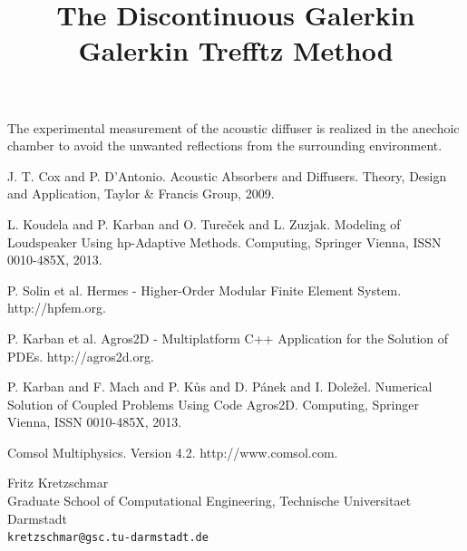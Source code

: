 \documentclass[article,A4,11pt]{llncs}%
\begin{document}
The experimental measurement of the acoustic diffuser is realized in the anechoic chamber to avoid the unwanted reflections from the surrounding environment.


\begin{thebibliography}{10}
{\sc  J. T. Cox and P. D’Antonio}. {Acoustic Absorbers and Diffusers}. Theory, Design and Application, Taylor \& Francis Group, 2009.

{\sc L. Koudela and P. Karban and O. Tureček and L. Zuzjak}. {Modeling of Loudspeaker Using hp-Adaptive Methods}. Computing, Springer Vienna, ISSN 0010-485X, 2013.

{\sc P. Solin et al}. {Hermes - Higher-Order Modular Finite Element System}. http://hpfem.org.

{\sc P. Karban et al}. {Agros2D - Multiplatform C++ Application for the Solution of PDEs}. http://agros2d.org.

{\sc P. Karban and F. Mach and P. Kůs and D. Pánek and I. Doležel}. {Numerical Solution of Coupled Problems Using Code Agros2D}. Computing, Springer Vienna, ISSN 0010-485X, 2013.

{\sc Comsol Multiphysics}. {Version 4.2}. http://www.comsol.com.
\end{thebibliography}

\title{The Discontinuous Galerkin Galerkin Trefftz Method}
 \author{} \institute{}
\maketitle
\begin{center}
{\large Fritz Kretzschmar}\\
Graduate School of Computational Engineering,  Technische Universitaet Darmstadt\\
{\tt kretzschmar@gsc.tu-darmstadt.de}
\end{center}
\end{document}

